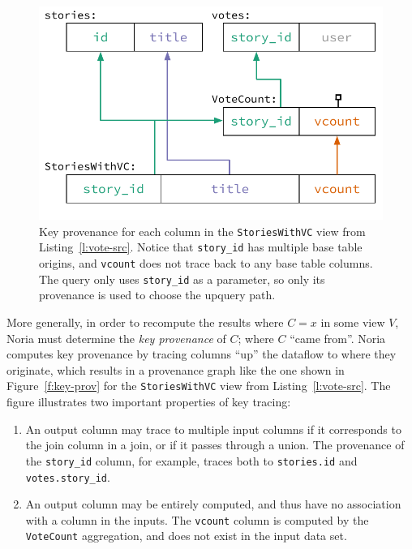 \begin{figure}[t]
  \centering
  \includegraphics{diagrams/Key Provenance.pdf}
  \caption{Key provenance for each column in the \texttt{StoriesWithVC} view
  from Listing~\ref{l:vote-src}. Notice that \texttt{story\_id} has multiple
  base table origins, and \texttt{vcount} does not trace back to any base table
  columns. The query only uses \texttt{story\_id} as a parameter, so only its
  provenance is used to choose the upquery path.}
  \label{f:key-prov}
\end{figure}

More generally, in order to recompute the results where $C = x$ in some view
$V$, Noria must determine the \textit{key provenance} of $C$; where $C$ ``came
from''. Noria computes key provenance by tracing columns ``up'' the dataflow to
where they originate, which results in a provenance graph like the one shown in
Figure~\vref{f:key-prov} for the \texttt{StoriesWithVC} view from
Listing~\vref{l:vote-src}. The figure illustrates two important properties of
key tracing:

\begin{enumerate}
  \item An output column may trace to multiple input columns if it corresponds
    to the join column in a join, or if it passes through a union. The
    provenance of the \texttt{story\_id} column, for example, traces both to
    \texttt{stories.id} and \texttt{votes.story\_id}.
  \item An output column may be entirely computed, and thus have no association
    with a column in the inputs. The \texttt{vcount} column is computed by the
    \texttt{VoteCount} aggregation, and does not exist in the input data set.
\end{enumerate}

